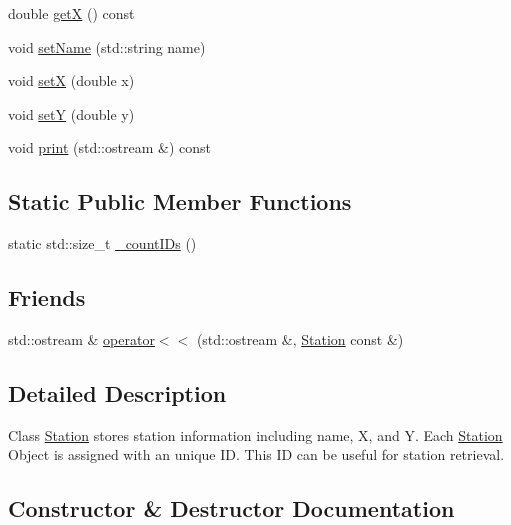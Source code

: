 \begin{DoxyCompactItemize}
\item 
double \mbox{\hyperlink{classanen_sta_1_1_station_a8f4b152659b571ef4d14159527d2037d}{getX}} () const
\item 
void \mbox{\hyperlink{classanen_sta_1_1_station_a8e124bea828292a973ccdfa8aff399cb}{set\+Name}} (std\+::string name)
\item 
void \mbox{\hyperlink{classanen_sta_1_1_station_aad174c1e68a7e008a81c1c7decd21064}{setX}} (double x)
\item 
void \mbox{\hyperlink{classanen_sta_1_1_station_afd21b8c9a5ebdf6f0423e95cf77daebb}{setY}} (double y)
\item 
void \mbox{\hyperlink{classanen_sta_1_1_station_a463e83848b188691dc554003b995ae6d}{print}} (std\+::ostream \&) const
\end{DoxyCompactItemize}
\subsection*{Static Public Member Functions}
\begin{DoxyCompactItemize}
\item 
static std\+::size\+\_\+t \mbox{\hyperlink{classanen_sta_1_1_station_a6623cdce8748308c6d0e27ab4a111eb7}{\+\_\+count\+I\+Ds}} ()
\end{DoxyCompactItemize}
\subsection*{Friends}
\begin{DoxyCompactItemize}
\item 
std\+::ostream \& \mbox{\hyperlink{classanen_sta_1_1_station_a98b2219804f7e593b080d3c8dec80f0b}{operator$<$$<$}} (std\+::ostream \&, \mbox{\hyperlink{classanen_sta_1_1_station}{Station}} const \&)
\end{DoxyCompactItemize}


\subsection{Detailed Description}
Class \mbox{\hyperlink{classanen_sta_1_1_station}{Station}} stores station information including name, X, and Y. Each \mbox{\hyperlink{classanen_sta_1_1_station}{Station}} Object is assigned with an unique ID. This ID can be useful for station retrieval. 

\subsection{Constructor \& Destructor Documentation}
\mbox{\label{classanen_sta_1_1_station_afb64bb9d68c519a693cd10af5d783873}} 
